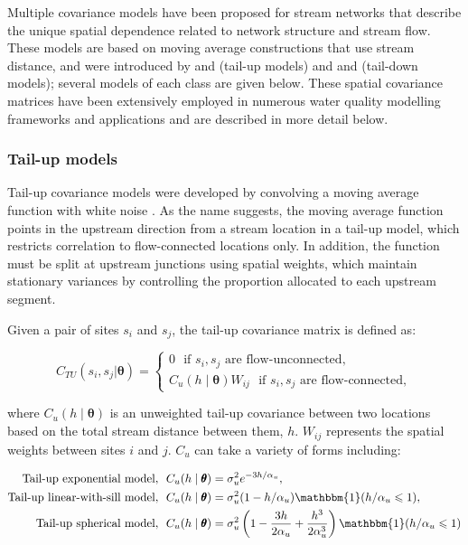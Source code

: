 Multiple covariance models have been proposed for stream networks that describe the unique spatial dependence related to network structure and stream flow. These models are based on moving average constructions that use stream distance, and were introduced by \citet{ver2006spatial} and \citet{cressie2006spatial} (tail-up models) and \citet{ver2010moving} and \citet{garreta2010spatial} (tail-down models); several models of each class are given below. These spatial covariance matrices have been extensively employed in numerous water quality modelling frameworks and applications \citep{money2009using, money2009modern, isaak2014applications, mcmanus2020variation, jackson2018spatio, rodriguez2019spatial} and are described in more detail below. 



\subsubsection{Tail-up models}
Tail-up covariance models were developed by convolving a moving average function with white noise \citep{ver2006spatial}. As the name suggests, the moving average function points in the upstream direction from a stream location in a tail-up model, which restricts correlation to flow-connected locations only. In addition, the function must be split at upstream junctions using spatial weights, which maintain stationary variances by controlling the proportion allocated to each upstream segment.

Given a pair of sites $s_i$ and $s_j$, the tail-up covariance matrix is defined as:

$$C_{TU}(s_i,s_j|\pmb{\theta}) = \left\{\begin{matrix}
0 \:\:\: \textrm{if $s_i,s_j$ are flow-unconnected}, \\C_u(h\mid \pmb{\theta}) W_{ij} \:\:\: \textrm{if $s_i,s_j$ are flow-connected}, \end{matrix}\right.$$

\noindent where $C_u(h\mid \pmb{\theta})$ is an unweighted tail-up covariance between two locations based on the total stream distance between them, $h$. $W_{ij}$ represents the spatial weights between sites $i$ and $j$. $C_u$ can take a variety of forms including:


\begin{align}
\textrm{Tail-up exponential model},& \ \ C_{u}(h \mid \pmb{\theta}) = \sigma_u^2 e^{-3h/\alpha_u}, \\
\textrm{Tail-up linear-with-sill model},& \ \ C_u(h \mid \pmb{\theta}) = \sigma_u^2 (1-h/\alpha_u)\mathbbm{1}(h/\alpha_u \leqslant 1), \\
\textrm{Tail-up spherical model},& \ \ C_u(h \mid \pmb{\theta}) = \sigma_u^2 \left(1-\frac{3h}{2\alpha_u} + \frac{h^3}{2\alpha_u^3}\right)\mathbbm{1}(h/\alpha_u \leqslant 1)
\end{align}

